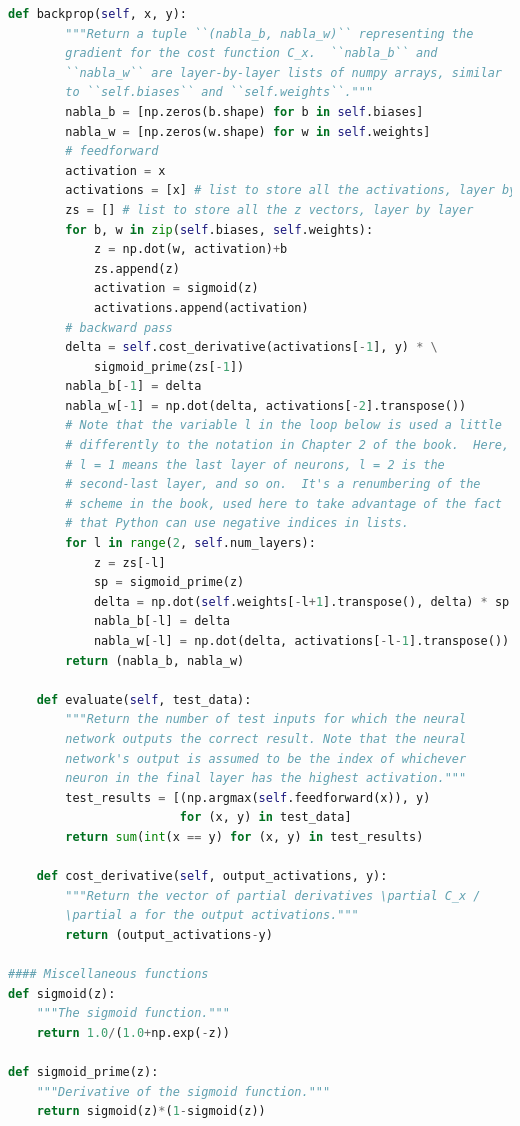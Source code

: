 \begin{lstlisting}[caption={network.py (Python 3.7.1)},label={lst:network.py}, language=Python]
    def backprop(self, x, y):
        """Return a tuple ``(nabla_b, nabla_w)`` representing the
        gradient for the cost function C_x.  ``nabla_b`` and
        ``nabla_w`` are layer-by-layer lists of numpy arrays, similar
        to ``self.biases`` and ``self.weights``."""
        nabla_b = [np.zeros(b.shape) for b in self.biases]
        nabla_w = [np.zeros(w.shape) for w in self.weights]
        # feedforward
        activation = x
        activations = [x] # list to store all the activations, layer by layer
        zs = [] # list to store all the z vectors, layer by layer
        for b, w in zip(self.biases, self.weights):
            z = np.dot(w, activation)+b
            zs.append(z)
            activation = sigmoid(z)
            activations.append(activation)
        # backward pass
        delta = self.cost_derivative(activations[-1], y) * \
            sigmoid_prime(zs[-1])
        nabla_b[-1] = delta
        nabla_w[-1] = np.dot(delta, activations[-2].transpose())
        # Note that the variable l in the loop below is used a little
        # differently to the notation in Chapter 2 of the book.  Here,
        # l = 1 means the last layer of neurons, l = 2 is the
        # second-last layer, and so on.  It's a renumbering of the
        # scheme in the book, used here to take advantage of the fact
        # that Python can use negative indices in lists.
        for l in range(2, self.num_layers):
            z = zs[-l]
            sp = sigmoid_prime(z)
            delta = np.dot(self.weights[-l+1].transpose(), delta) * sp
            nabla_b[-l] = delta
            nabla_w[-l] = np.dot(delta, activations[-l-1].transpose())
        return (nabla_b, nabla_w)

    def evaluate(self, test_data):
        """Return the number of test inputs for which the neural
        network outputs the correct result. Note that the neural
        network's output is assumed to be the index of whichever
        neuron in the final layer has the highest activation."""
        test_results = [(np.argmax(self.feedforward(x)), y)
                        for (x, y) in test_data]
        return sum(int(x == y) for (x, y) in test_results)

    def cost_derivative(self, output_activations, y):
        """Return the vector of partial derivatives \partial C_x /
        \partial a for the output activations."""
        return (output_activations-y)

#### Miscellaneous functions
def sigmoid(z):
    """The sigmoid function."""
    return 1.0/(1.0+np.exp(-z))

def sigmoid_prime(z):
    """Derivative of the sigmoid function."""
    return sigmoid(z)*(1-sigmoid(z))
\end{lstlisting}

